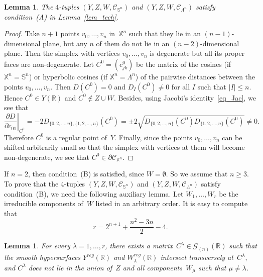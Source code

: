 \documentclass[reqno,tbtags,12pt]{amsart}
\numberwithin{equation}{section}
\newcommand{\R}{\mathbb{R}}
\newcommand{\CC}{\mathcal{C}}
\newcommand{\X}{\mathbb{X}}
\newcommand{\bS}{\mathbb{S}}
\newcommand{\CG}{\mathcal{G}}
\newtheorem{lem}[theorem]{Lemma}
\theoremstyle{definition}
\begin{document}
{\sloppy
\begin{lem}\label{lem_A}
The $4$-tuples\/ $(Y,Z,W,\CC_{\bS^n})$ and\/ $(Y,Z,W,\CC_{\Lambda^n})$ satisfy condition\/~\textnormal{(A)} in Lemma~\ref{lem_tech}.
\end{lem}

}

\begin{proof}
Take $n+1$ points $v_0,\ldots,v_n$ in~$\X^n$ such that they lie in an $(n-1)$-dimensional plane, but any $n$ of them do not lie in an  $(n-2)$-dimensional plane. Then the simplex with vertices $v_0,\ldots,v_n$ is degenerate but all its proper faces are non-degenerate. Let $C^0=(c_{jk}^0)$ be the matrix of the cosines (if $\X^n=\bS^n$) or hyperbolic cosines (if $\X^n=\Lambda^n$) of the pairwise distances between the points $v_0,\ldots,v_n$. Then $D(C^0)=0$ and $D_I(C^0)\ne 0$ for all $I$ such that $|I|\le n$. Hence $C^0\in Y(\R)$ and $C^0\notin Z\cup W$. Besides, using Jacobi's identity~\eqref{eq_Jac}, we see that
$$
\left.\frac{\partial D}{\partial c_{01}}\right|_{C^0}=-2D_{\{0,2,\ldots,n\},\{1,2,\ldots,n\}}(C^0)=
\pm 2\sqrt{D_{\{0,2,\ldots,n\}}(C^0)D_{\{1,2,\ldots,n\}}(C^0)}\ne 0.
$$
Therefore $C^0$ is a regular point of~$Y$. Finally, since the points $v_0,\ldots,v_n$ can be shifted arbitrarily small so that the simplex with vertices at them will become non-degenerate, we see that $C^0\in\partial\CC_{\X^n}$.
\end{proof}

If $n=2$, then condition~(B) is satisfied, since $W=\emptyset$. So we assume that $n\ge 3$. 
To prove that  the $4$-tuples $(Y,Z,W,\CC_{\bS^n})$  and  $(Y,Z,W,\CC_{\Lambda^n})$ satisfy condition~(B), we need the following auxiliary lemma. Let $W_1,\ldots, W_r$ be the irreducible components of~$W$ listed in an arbitrary order. It is easy to compute that $$r=2^{n+1}+\frac{n^2-3n}{2}-4.$$

\begin{lem}\label{lem_Cs}
For every $\lambda=1,\ldots,r$, there exists a matrix~$C^{\lambda}\in\CG_{(n)}(\R)$ such that the smooth hypersurfaces $Y^{reg}(\R)$ and $W_{\lambda}^{reg}(\R)$ intersect transversely at\/~$C^{\lambda},$ and $C^{\lambda}$ does not lie in the union of\/~$Z$ and all components\/~$W_{\mu}$ such that\/ $\mu\ne \lambda$.    
\end{lem}
\end{document}
